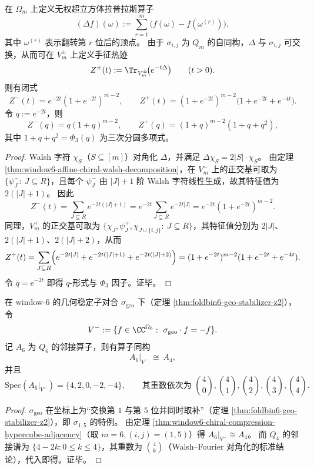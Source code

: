 \begin{theorem}\label{thm:window6-chiral-heat-trace-phi3}
在 \(\Omega_m\) 上定义无权超立方体拉普拉斯算子
\[
(\Delta f)(\omega):=\sum_{r=1}^{m}\bigl(f(\omega)-f(\omega^{(r)})\bigr),
\]
其中 \(\omega^{(r)}\) 表示翻转第 \(r\) 位后的顶点。
由于 \(\sigma_{i,j}\) 为 \(Q_m\) 的自同构，\(\Delta\) 与 \(\sigma_{i,j}\) 可交换，从而可在 \(V_m^\pm\) 上定义手征热迹
\[
Z^\pm(t):=\Tr_{V_m^\pm}\!\bigl(e^{-t\Delta}\bigr)\qquad(t>0).
\]
则有闭式
\[
Z^-(t)=e^{-2t}(1+e^{-2t})^{m-2},
\qquad
Z^+(t)=(1+e^{-2t})^{m-2}\bigl(1+e^{-2t}+e^{-4t}\bigr).
\]
令 \(q:=e^{-2t}\)，则
\[
Z^-(q)=q(1+q)^{m-2},
\qquad
Z^+(q)=(1+q)^{m-2}(1+q+q^2),
\]
其中 \(1+q+q^2=\Phi_3(q)\) 为三次分圆多项式。
\end{theorem}
\begin{proof}
Walsh 字符 \(\chi_S\)（\(S\subseteq[m]\)）对角化 \(\Delta\)，并满足
\(
\Delta\chi_S=2|S|\cdot \chi_S
\)。
由定理 \ref{thm:window6-affine-chiral-walsh-decomposition}，在 \(V_m^-\) 上的正交基可取为 \(\{\psi_J^-:\ J\subseteq R\}\)，且每个 \(\psi_J^-\) 由 \(|J|+1\) 阶 Walsh 字符线性生成，故其特征值为 \(2(|J|+1)\)。
因此
\[
Z^-(t)=\sum_{J\subseteq R}e^{-2t(|J|+1)}=e^{-2t}\sum_{J\subseteq R}e^{-2t|J|}
=e^{-2t}(1+e^{-2t})^{m-2}.
\]
同理，\(V_m^+\) 的正交基可取为 \(\{\chi_J,\psi_J^+,\chi_{J\cup\{i,j\}}:\ J\subseteq R\}\)，其特征值分别为 \(2|J|\)、\(2(|J|+1)\)、\(2(|J|+2)\)，从而
\[
Z^+(t)=\sum_{J\subseteq R}\Bigl(e^{-2t|J|}+e^{-2t(|J|+1)}+e^{-2t(|J|+2)}\Bigr)
=(1+e^{-2t})^{m-2}(1+e^{-2t}+e^{-4t}).
\]
令 \(q=e^{-2t}\) 即得 \(q\)-形式与 \(\Phi_3\) 因子。证毕。
\end{proof}

\begin{corollary}\label{cor:window6-chiral-sector-q4-spectrum}
在 window-\(6\) 的几何稳定子对合 \(\sigma_{\mathrm{geo}}\) 下（定理 \ref{thm:foldbin6-geo-stabilizer-z2}），令
\[
V^-:=\{f\in\CC^{\Omega_6}:\ \sigma_{\mathrm{geo}}\cdot f=-f\}.
\]
记 \(A_6\) 为 \(Q_6\) 的邻接算子，则有算子同构
\[
A_6|_{V^-}\ \cong\ A_4,
\]
并且
\[
\mathrm{Spec}(A_6|_{V^-})=\{4,2,0,-2,-4\},
\qquad
\text{其重数依次为 }\binom40,\binom41,\binom42,\binom43,\binom44.
\]
\end{corollary}
\begin{proof}
\(\sigma_{\mathrm{geo}}\) 在坐标上为“交换第 \(1\) 与第 \(5\) 位并同时取补”（定理 \ref{thm:foldbin6-geo-stabilizer-z2}），即 \(\sigma_{1,5}\) 的特例。
由定理 \ref{thm:window6-chiral-compression-hypercube-adjacency}（取 \(m=6,(i,j)=(1,5)\)）得 \(A_6|_{V^-}\cong A_4\)。
而 \(Q_4\) 的邻接谱为 \(\{4-2k:0\le k\le 4\}\)，其重数为 \(\binom{4}{k}\)（Walsh--Fourier 对角化的标准结论），代入即得。证毕。
\end{proof}

